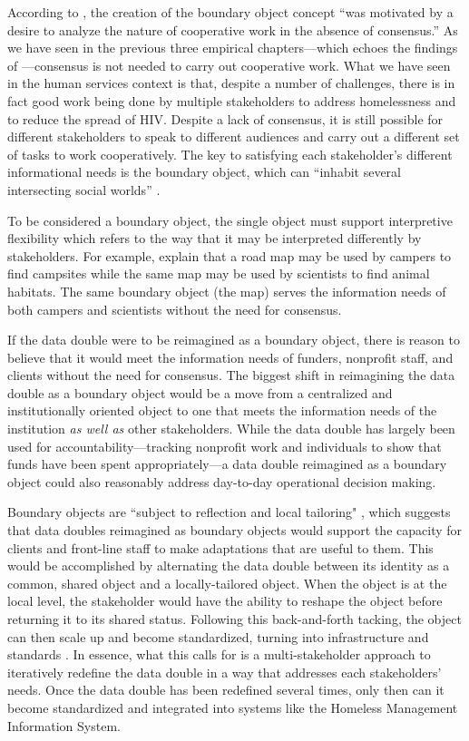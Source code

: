 According to \citet{Star2010Boundary}, the creation of the boundary object concept ``was motivated by a desire to analyze the nature of cooperative work in the absence of consensus.'' As we have seen in the previous three empirical chapters---which echoes the findings of \citet{Star1989Ecology}---consensus is not needed to carry out cooperative work. What we have seen in the human services context is that, despite a number of challenges, there is in fact good work being done by multiple stakeholders to address homelessness and to reduce the spread of HIV. Despite a lack of consensus, it is still possible for different stakeholders to speak to different audiences and carry out a different set of tasks to work cooperatively. The key to satisfying each stakeholder's different informational needs is the boundary object, which can ``inhabit several intersecting social worlds'' \citep{Star1989Ecology}.

To be considered a boundary object, the single object must support interpretive flexibility which refers to the way that it may be interpreted differently by stakeholders. For example, \citet{Star1989Ecology} explain that a road map may be used by campers to find campsites while the same map may be used by scientists to find animal habitats. The same boundary object (the map) serves the information needs of both campers and scientists without the need for consensus.

If the data double were to be reimagined as a boundary object, there is reason to believe that it would meet the information needs of funders, nonprofit staff, and clients without the need for consensus. The biggest shift in reimagining the data double as a boundary object would be a move from a centralized and institutionally oriented object to one that meets the information needs of the institution \textit{as well as} other stakeholders. While the data double has largely been used for accountability---tracking nonprofit work and individuals to show that funds have been spent appropriately---a data double reimagined as a boundary object could also reasonably address day-to-day operational decision making.

Boundary objects are ``subject to reflection and local tailoring" \citep{Star2010Boundary}, which suggests that data doubles reimagined as boundary objects would support the capacity for clients and front-line staff to make adaptations that are useful to them. This would be accomplished by alternating the data double between its identity as a common, shared object and a locally-tailored object. When the object is at the local level, the stakeholder would have the ability to reshape the object before returning it to its shared status. Following this back-and-forth tacking, the object can then scale up and become standardized, turning into infrastructure and standards \citep{Star2010Boundary}. In essence, what this calls for is a multi-stakeholder approach to iteratively redefine the data double in a way that addresses each stakeholders' needs. Once the data double has been redefined several times, only then can it become standardized and integrated into systems like the Homeless Management Information System.

